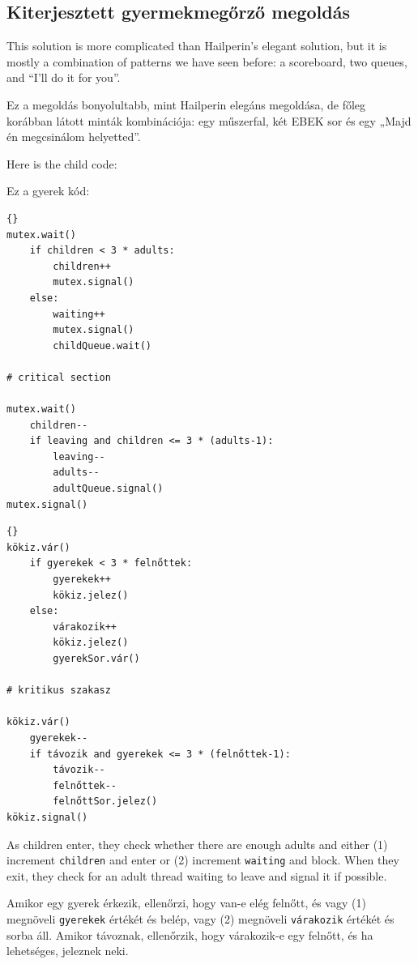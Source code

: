 \documentclass{book}
\newcommand{\clearemptydoublepage}{\newpage\cleardoublepage}
\begin{document}
\clearemptydoublepage
\subsection{Kiterjesztett gyermekmegőrző megoldás}

This solution is more complicated than
Hailperin's elegant solution, but it is mostly a combination
of patterns we have seen before: a scoreboard, two queues,
and ``I'll do it for you''.

Ez a megoldás bonyolultabb, mint Hailperin elegáns megoldása,
de főleg korábban látott minták kombinációja: egy műszerfal,
két EBEK sor és egy „Majd én megcsinálom helyetted”.

Here is the child code:

Ez a gyerek kód:

\begin{lstlisting}[title={Extended child care solution (child)}]{}
mutex.wait()
    if children < 3 * adults:
        children++
        mutex.signal()
    else:
        waiting++
        mutex.signal()
        childQueue.wait()

# critical section

mutex.wait()
    children--
    if leaving and children <= 3 * (adults-1):
        leaving--
        adults--
        adultQueue.signal() 
mutex.signal()
\end{lstlisting}

\begin{lstlisting}[title={Kiterjesztett gyermekmegőrző megoldás (gyerek)}]{}
kökiz.vár()
    if gyerekek < 3 * felnőttek:
        gyerekek++
        kökiz.jelez()
    else:
        várakozik++
        kökiz.jelez()
        gyerekSor.vár()

# kritikus szakasz

kökiz.vár()
    gyerekek--
    if távozik and gyerekek <= 3 * (felnőttek-1):
        távozik--
        felnőttek--
        felnőttSor.jelez() 
kökiz.signal()
\end{lstlisting}

As children enter, they check whether there are enough adults
and either (1) increment {\tt children} and enter or (2) increment
{\tt waiting} and block.
When they exit, they check for an adult thread waiting to leave and
signal it if possible.

Amikor egy gyerek érkezik, ellenőrzi, hogy van-e elég felnőtt,
és vagy (1) megnöveli {\tt gyerekek} értékét és belép, vagy (2)
megnöveli {\tt várakozik} értékét és sorba áll.
Amikor távoznak, ellenőrzik, hogy várakozik-e egy felnőtt,
és ha lehetséges, jeleznek neki.
\end{document}
